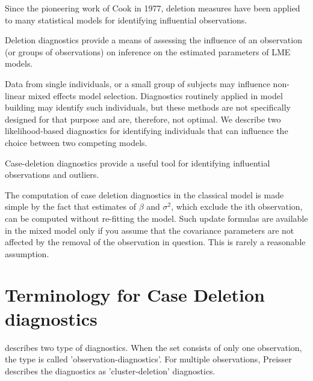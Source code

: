 \documentclass[12pt, a4paper]{article}
\begin{document}
			Since the pioneering work of Cook in 1977, deletion measures have been applied to many statistical models for identifying influential observations.
			
			Deletion diagnostics provide a means of assessing the influence of an observation (or groups of observations) on inference on the estimated parameters of LME models.
			
			Data from single individuals, or a small group of subjects may influence non-linear mixed effects model selection. Diagnostics routinely applied in model building may identify such individuals, but these methods are not specifically designed for that purpose and are, therefore, not optimal. We describe two likelihood-based diagnostics for identifying individuals that can influence the choice between two competing models.
			
			Case-deletion diagnostics provide a useful tool for identifying influential observations and outliers.
			
			The computation of case deletion diagnostics in the classical model is made simple by the fact that estimates of $\beta$ and $\sigma^2$, which exclude the ith observation, can be computed without re-fitting the model. Such update formulas are available in the mixed model only if you assume that the covariance parameters are not affected by the removal of the observation in question. This is rarely a reasonable assumption.
			
			\section{Terminology for Case Deletion diagnostics} %
			
			\citet{preisser} describes two type of diagnostics. When the set consists of only one observation, the type is called
			'observation-diagnostics'. For multiple observations, Preisser describes the diagnostics as 'cluster-deletion' diagnostics.
			
			
			
			
			
		
\end{document}
